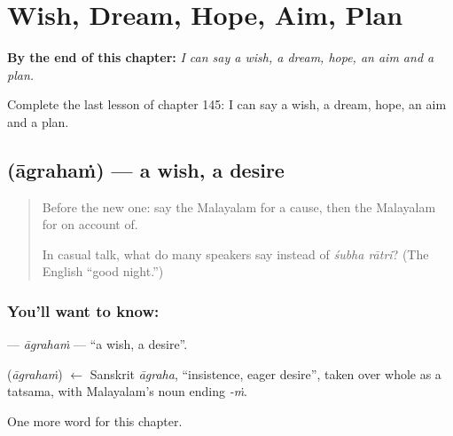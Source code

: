 
\chapter{Wish, Dream, Hope, Aim, Plan}
\label{ch:ml-wish-dream-hope-aim-plan}

\begin{chapteropening}
\textbf{By the end of this chapter:} \emph{I can say a wish, a dream, hope, an aim and a plan.}

Complete the last lesson of chapter 145: I can say a wish, a dream, hope, an aim and a plan.
\end{chapteropening}

\section[\texorpdfstring{\ml{ആഗ്രഹം} (āgrahaṁ)}{ആഗ്രഹം (āgrahaṁ)}]{ (āgrahaṁ) — a wish, a desire}

\label{lesson:ML-C145-agraham}



\begin{quote}
Before the new one: say the Malayalam for a cause, then the Malayalam for on account of.

In casual talk, what do many speakers say instead of \emph{śubha rātri}? (The English \textquotedblleft{}good night.\textquotedblright{})
\end{quote}

\subsection*{You'll want to know: }
\textbf{} — \emph{āgrahaṁ} — \textquotedblleft{}a wish, a desire\textquotedblright{}.

\begin{cousinweb}
\textbf{} (\emph{āgrahaṁ}) $\leftarrow$ Sanskrit \emph{āgraha}, \textquotedblleft{}insistence, eager desire\textquotedblright{}, taken over whole as a tatsama, with Malayalam's noun ending \emph{-ṁ}.
\end{cousinweb}

\begin{grammarlens}[title={What you've built}]
One more word for this chapter.
\end{grammarlens}

